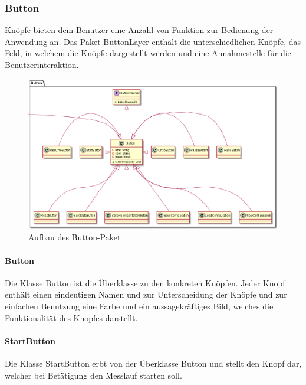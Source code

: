 \documentclass[parskip=full]{scrartcl}
\begin{document}
\newpage

\subsubsection{Button}

Knöpfe bieten dem Benutzer eine Anzahl von Funktion zur Bedienung der Anwendung an. Das Paket ButtonLayer enthält die unterschiedlichen Knöpfe, das Feld, in welchem die Knöpfe dargestellt werden und eine Annahmestelle für die Benutzerinteraktion.

\begin{figure}[htbp]
	\begin{center}
		\includegraphics[width = 14cm]{Grafiken/View/ButtonNamespace.png}
		\caption{Aufbau des Button-Paket}
		\label{Entwurf_Grob}
	\end{center}
\end{figure}

\paragraph{Button}

Die Klasse Button ist die Überklasse zu den konkreten Knöpfen. Jeder Knopf enthält einen eindeutigen Namen und zur Unterscheidung der Knöpfe und zur einfachen Benutzung eine Farbe und ein aussagekräftiges Bild, welches die Funktionalität des Knopfes darstellt.

\paragraph{StartButton}

Die Klasse StartButton erbt von der Überklasse Button und stellt den Knopf dar, welcher bei Betätigung den Messlauf starten soll.
\end{document}
